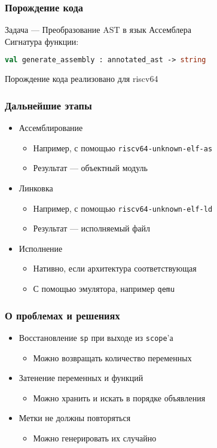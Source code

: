 \documentclass{beamer}
\begin{document}
	\begin{frame}[fragile]
		\frametitle{Порождение кода}
		Задача — Преобразование AST в язык Ассемблера
		\\
		Сигнатура функции:
		\begin{lstlisting}[language=ML] 
		val generate_assembly : annotated_ast -> string
		\end{lstlisting}
		
		Порождение кода реализовано для riscv64
	\end{frame}

	\begin{frame}
		\frametitle{Дальнейшие этапы}
		\begin{itemize}
			\item Ассемблирование
			\begin{itemize}
				\item Например, с помощью \lstinline|riscv64-unknown-elf-as|
				\item Результат — объектный модуль
			\end{itemize}
			\item Линковка
				\begin{itemize}
					\item Например, с помощью \lstinline|riscv64-unknown-elf-ld|
					\item Результат — исполняемый файл
				\end{itemize}
			\item Исполнение
			\begin{itemize}
				\item Нативно, если архитектура соответствующая
				\item С помощью эмулятора, например \lstinline|qemu|
			\end{itemize}
		\end{itemize}
	\end{frame}

	\begin{frame}
		\frametitle{О проблемах и решениях}
		\begin{itemize}
			\item Восстановление \lstinline|sp| при выходе из \lstinline|scope|'а
			\begin{itemize}
				\item Можно возвращать количество переменных
			\end{itemize}
			\item Затенение переменных и функций
			\begin{itemize}		
				\item Можно хранить и искать в порядке объявления
			\end{itemize}
			\item Метки не должны повторяться
			\begin{itemize}
				\item Можно генерировать их случайно
			\end{itemize}
		\end{itemize}
	\end{frame}
\end{document}
